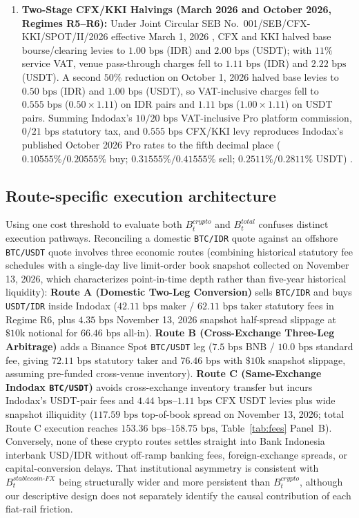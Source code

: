 \begin{enumerate}
  \item \textbf{Two-Stage CFX/KKI Halvings (March 2026 and October 2026, Regimes R5--R6):} Under Joint Circular SEB No.\ 001/SEB/CFX-KKI/SPOT/II/2026 effective March 1, 2026 \citep{cfx_seb001_2026}, CFX and KKI halved base bourse/clearing levies to $1.00\text{ bps}$ (IDR) and $2.00\text{ bps}$ (USDT); with $11\%$ service VAT, venue pass-through charges fell to $1.11\text{ bps}$ (IDR) and $2.22\text{ bps}$ (USDT). A second $50\%$ reduction on October 1, 2026 halved base levies to $0.50\text{ bps}$ (IDR) and $1.00\text{ bps}$ (USDT), so VAT-inclusive charges fell to $0.555\text{ bps}$ ($0.50 \times 1.11$) on IDR pairs and $1.11\text{ bps}$ ($1.00 \times 1.11$) on USDT pairs. Summing Indodax's $10/20\text{ bps}$ VAT-inclusive Pro platform commission, $0/21\text{ bps}$ statutory tax, and $0.555\text{ bps}$ CFX/KKI levy reproduces Indodax's published October 2026 Pro rates to the fifth decimal place ($0.10555\%/0.20555\%$ buy; $0.31555\%/0.41555\%$ sell; $0.2511\%/0.2811\%$ USDT) \citep{indodax_fees_2026}.
\end{enumerate}



\subsection{Route-specific execution architecture}
Using one cost threshold to evaluate both $B_t^{crypto}$ and $B_t^{total}$ confuses distinct execution pathways. Reconciling a domestic \texttt{BTC/IDR} quote against an offshore \texttt{BTC/USDT} quote involves three economic routes (combining historical statutory fee schedules with a single-day live limit-order book snapshot collected on November 13, 2026, which characterizes point-in-time depth rather than five-year historical liquidity):
\textbf{Route A (Domestic Two-Leg Conversion)} sells \texttt{BTC/IDR} and buys \texttt{USDT/IDR} inside Indodax ($42.11\text{ bps}$ maker / $62.11\text{ bps}$ taker statutory fees in Regime R6, plus $4.35\text{ bps}$ November 13, 2026 snapshot half-spread slippage at $\$10\text{k}$ notional for $66.46\text{ bps}$ all-in). \textbf{Route B (Cross-Exchange Three-Leg Arbitrage)} adds a Binance Spot \texttt{BTC/USDT} leg ($7.5\text{ bps}$ BNB / $10.0\text{ bps}$ standard fee, giving $72.11\text{ bps}$ statutory taker and $76.46\text{ bps}$ with $\$10\text{k}$ snapshot slippage, assuming pre-funded cross-venue inventory). \textbf{Route C (Same-Exchange Indodax \texttt{BTC/USDT})} avoids cross-exchange inventory transfer but incurs Indodax's USDT-pair fees and $4.44\text{ bps}$--$1.11\text{ bps}$ CFX USDT levies plus wide snapshot illiquidity ($117.59\text{ bps}$ top-of-book spread on November 13, 2026; total Route C execution reaches $153.36\text{ bps}$--$158.75\text{ bps}$, Table~\ref{tab:fees} Panel~B). Conversely, none of these crypto routes settles straight into Bank Indonesia interbank USD/IDR without off-ramp banking fees, foreign-exchange spreads, or capital-conversion delays. That institutional asymmetry is consistent with $B_t^{stablecoin\text{-}FX}$ being structurally wider and more persistent than $B_t^{crypto}$, although our descriptive design does not separately identify the causal contribution of each fiat-rail friction.
